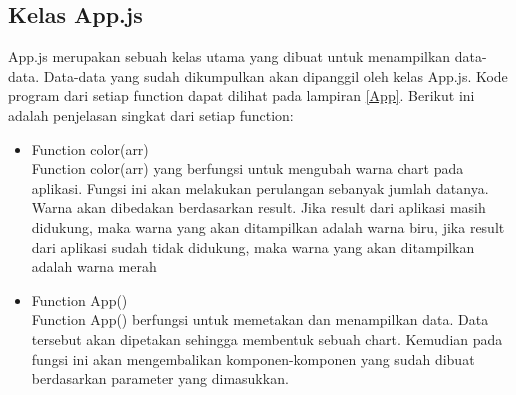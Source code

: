 \subsection{Kelas App.js}
App.js merupakan sebuah kelas utama yang dibuat untuk menampilkan data-data. Data-data yang sudah dikumpulkan akan dipanggil oleh kelas App.js. Kode program dari setiap function dapat dilihat pada lampiran \ref{App}. Berikut ini adalah penjelasan singkat dari setiap function: 
\begin{itemize}
	\item Function color(arr)\\
	Function color(arr) yang berfungsi untuk mengubah warna chart pada aplikasi. Fungsi ini akan melakukan perulangan sebanyak jumlah datanya. Warna akan dibedakan berdasarkan result. Jika result dari aplikasi masih didukung, maka warna yang akan ditampilkan adalah warna biru, jika result dari aplikasi sudah tidak didukung, maka warna yang akan ditampilkan adalah warna merah
	\item Function App()\\
	Function App() berfungsi untuk memetakan dan menampilkan data. Data tersebut akan dipetakan sehingga membentuk sebuah chart. Kemudian pada fungsi ini akan mengembalikan komponen-komponen yang sudah dibuat berdasarkan parameter yang dimasukkan. 
\end{itemize}








